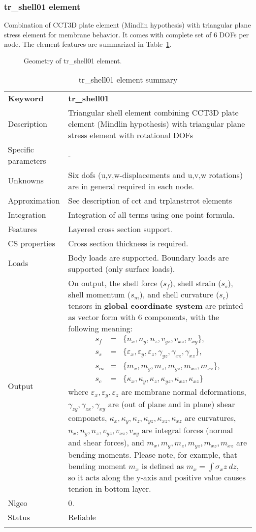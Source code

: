 \documentclass[a4paper]{article}
\newcommand{\param}[1]{\texttt{#1}} %
\newcommand{\templabel}{}%
\newcommand{\tempcaption}{}%
\newcounter{nelpar}
\newenvironment{elementsummary}[5]{%
  \gdef\tempcaption{#4}%
  \gdef\templabel{#5}%
  \setcounter{nelpar}{0}%
  \begin{center} %
    \begin{table}[!htb] %
      \begin{tabular}{|l|p{9cm}|}\hline %
        {\bf Keyword} & \bf{#1}\\ %
        {Description} & {#2}\\ %
        {Specific parameters} & {#3}\\ \hline %
}{
  \\ \hline %
      \end{tabular}%
      \caption{\tempcaption}%
      \label{\templabel}%
    \end{table}%
  \end{center}%
}
\newcommand{\elementParam}[1]{%
  \ifthenelse{\value{nelpar}>0} %
             {&{#1}}%
             {\setcounter{nelpar}{1}Parameters&{#1}}%
             \\%
}
\newcommand{\elementDescription}[2]{{#1} & {#2}\\ }
\begin{document}
\subsubsection {tr\_shell01 element}
Combination of CCT3D plate element (Mindlin hypothesis) with triangular plane stress element
for membrane behavior. It comes with complete set of 6 DOFs per node. 
The element features are summarized in Table~\ref{trshell01summary}.
\begin{figure}[htb]
 \centering
 \begin{makeimage}
  
 \end{makeimage}
 \caption{Geometry of tr\_shell01 element.}
\end{figure}

\begin{elementsummary}{tr\_shell01}{Triangular shell element combining CCT3D plate element (Mindlin hypothesis) with triangular plane stress element with rotational DOFs}{-}{tr\_shell01 element summary}{trshell01summary}
\elementDescription{Unknowns}{Six dofs (u,v,w-displacements and u,v,w rotations) are in general required in each node.}
\elementDescription{Approximation}{See description of cct and trplanstrrot elements}
\elementDescription{Integration}{Integration of all terms using one point formula.}
\elementDescription{Features}{Layered cross section support.}
\elementDescription{CS properties}{Cross section thickness is required.}
\elementDescription{Loads}{Body loads are supported. Boundary loads are supported (only surface loads).}
\elementDescription{Output}{On output, the shell force ($s_f$), shell strain ($s_s$), shell momentum ($s_m$), and shell curvature ($s_c$) tensors in \textbf{global coordinate system} are printed as vector form with 6 components, with the following meaning:
\begin{eqnarray*}
s_f&=&\{n_x, n_y, n_z, v_{yz}, v_{xz}, v_{xy}\},\\
s_s&=&\{\varepsilon_x, \varepsilon_y, \varepsilon_z, \gamma_{yz}, \gamma_{xz}, \gamma_{xz}\},\\
s_m&=&\{m_x, m_y, m_z, m_{yz}, m_{xz}, m_{xz}\},\\
s_c&=&\{\kappa_x, \kappa_y, \kappa_z, \kappa_{yz}, \kappa_{xz}, \kappa_{xz}\}
\end{eqnarray*}
where $\varepsilon_x, \varepsilon_y, \varepsilon_z$ are membrane normal deformations, $\gamma_{zy}, \gamma_{zx}, \gamma_{xy}$ are (out of plane and in plane) shear componets, $\kappa_x, \kappa_y, \kappa_z, \kappa_{yz}, \kappa_{xz}, \kappa_{xz}$ are curvatures, $n_x, n_y, n_z, v_{yz}, v_{xz}, v_{xy}$ are integral forces (normal and shear forces), and $m_x, m_y, m_z, m_{yz}, m_{xz}, m_{xz}$ are bending moments. 
Please note, for example, that bending moment $m_x$ is defined as $m_x=\int \sigma_x z\ dz$, so it acts along the y-axis and positive value causes tension in bottom layer.}
\elementDescription{Nlgeo}{0.}
\elementDescription{Status}{Reliable}
\end{elementsummary}
\end{document}
